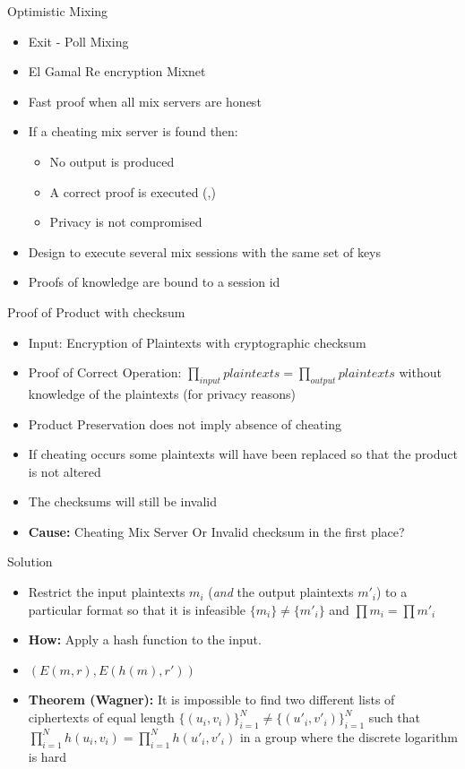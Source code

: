 \documentclass{beamer}
\begin{document}
\begin{frame}[allowframebreaks]{Optimistic Mixing \cite{Opt02}}

\begin{itemize}
\item Exit - Poll Mixing
\item El Gamal Re encryption Mixnet
\item Fast proof when all mix servers are honest
\item If a cheating mix server is found then:
\begin{itemize}
	\item No output is produced
	\item A correct proof is executed (\cite{Neff01},\cite{FS01})
	\item Privacy is not compromised
\end{itemize}
\item Design to execute several mix sessions with the same set of keys
\item Proofs of knowledge are bound to a session id
\end{itemize}

\framebreak

{Proof of Product with checksum}
\begin{itemize}
\item Input: Encryption of Plaintexts with cryptographic checksum
\item Proof of Correct Operation: $ \prod_{input}plaintexts = \prod_{output}plaintexts $ without knowledge of the plaintexts (for privacy reasons)
\item Product Preservation does not imply absence of cheating
\item If cheating occurs some plaintexts will have been replaced so that the product is not altered
\item The checksums will still be invalid
\item \textbf{Cause:} Cheating Mix Server Or Invalid checksum in the first place?

\end{itemize}

\framebreak

\begin{block}{Solution}
\begin{itemize}
\item Restrict the input plaintexts $m_i$ (\textit{and} the output plaintexts $m'_i$) to a particular format so that it is infeasible
$ \{m_i\} \neq \{m'_i\} $ and $ \prod m_i = \prod m'_i $
\item \textbf{How:} Apply a hash function to the input.
\item $(E(m,r), E(h(m),r'))$
\item \textbf{Theorem (Wagner):}
It is impossible to find two different lists of ciphertexts of equal length $ \{(u_i,v_i)\}_{i=1}^N \neq \{(u'_i,v'_i)\}_{i=1}^N $ 
such that $ \prod_{i=1}^N h(u_i,v_i) = \prod_{i=1}^N h(u'_i,v'_i) $ in a group where the discrete logarithm is hard
\end{itemize}
\end{block}


\end{frame}
\end{document}
